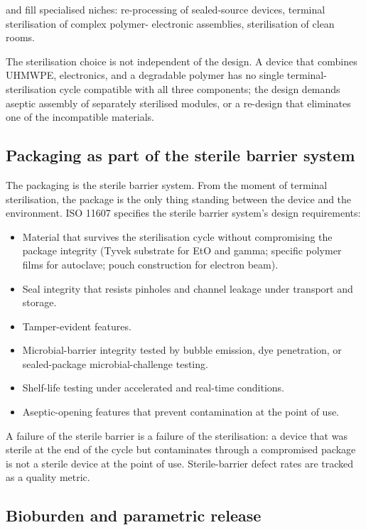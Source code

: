  and
 fill specialised niches: re-processing of
sealed-source devices, terminal sterilisation of complex polymer-
electronic assemblies, sterilisation of clean rooms.

The sterilisation choice is not independent of the design. A
device that combines UHMWPE, electronics, and a degradable polymer
has no single terminal-sterilisation cycle compatible with all
three components; the design demands aseptic assembly of separately
sterilised modules, or a re-design that eliminates one of the
incompatible materials.

\subsection{Packaging as part of the sterile barrier system}

The packaging is the sterile barrier system. From the moment of
terminal sterilisation, the package is the only thing standing
between the device and the environment. ISO 11607 specifies the
sterile barrier system's design requirements:

\begin{itemize}[leftmargin=*]
\item Material that survives the sterilisation cycle without
  compromising the package integrity (Tyvek substrate for EtO and
  gamma; specific polymer films for autoclave; pouch construction
  for electron beam).
\item Seal integrity that resists pinholes and channel leakage
  under transport and storage.
\item Tamper-evident features.
\item Microbial-barrier integrity tested by bubble emission,
  dye penetration, or sealed-package microbial-challenge testing.
\item Shelf-life testing under accelerated and real-time
  conditions.
\item Aseptic-opening features that prevent contamination at the
  point of use.
\end{itemize}

A failure of the sterile barrier is a failure of the sterilisation:
a device that was sterile at the end of the cycle but contaminates
through a compromised package is not a sterile device at the point
of use. Sterile-barrier defect rates are tracked as a quality
metric.

\subsection{Bioburden and parametric release}


